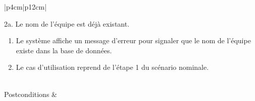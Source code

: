 \begin{longtable}{|p{4cm}|p{12cm}|}
                    \begin{minipage}[t]{\linewidth}
                        2a. Le nom de l'équipe est déjà existant.
                        \begin{enumerate}[nosep,after=\strut]
                              \item Le système affiche un message d'erreur pour signaler que le nom de l'équipe existe dans la base de données.
                              \item Le cas d’utilisation reprend de l’étape 1 du scénario nominale.
                        \end{enumerate}
                    \end{minipage}
                    \\
                    
                    \hline
                    Postconditions &   \\
                    \hline
                    \caption{Description du cas d'utilisation « Ajouter équipe »}\\
            \end{longtable}        
            
